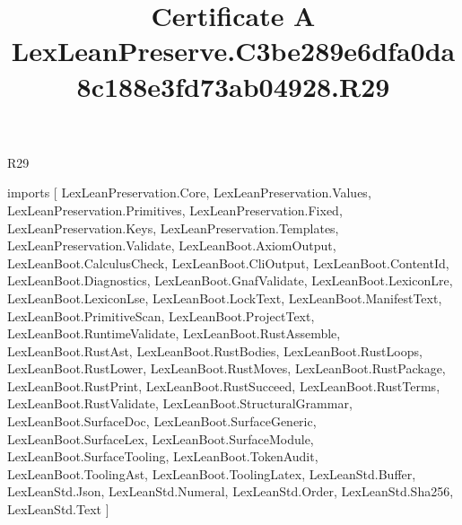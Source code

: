 \begin{lexlean}{R29}
\title{Certificate A LexLeanPreserve.C3be289e6dfa0da8c188e3fd73ab04928.R29}
\begin{coremodule}
imports [
  LexLeanPreservation.Core,
  LexLeanPreservation.Values,
  LexLeanPreservation.Primitives,
  LexLeanPreservation.Fixed,
  LexLeanPreservation.Keys,
  LexLeanPreservation.Templates,
  LexLeanPreservation.Validate,
  LexLeanBoot.AxiomOutput,
  LexLeanBoot.CalculusCheck,
  LexLeanBoot.CliOutput,
  LexLeanBoot.ContentId,
  LexLeanBoot.Diagnostics,
  LexLeanBoot.GnafValidate,
  LexLeanBoot.LexiconLre,
  LexLeanBoot.LexiconLse,
  LexLeanBoot.LockText,
  LexLeanBoot.ManifestText,
  LexLeanBoot.PrimitiveScan,
  LexLeanBoot.ProjectText,
  LexLeanBoot.RuntimeValidate,
  LexLeanBoot.RustAssemble,
  LexLeanBoot.RustAst,
  LexLeanBoot.RustBodies,
  LexLeanBoot.RustLoops,
  LexLeanBoot.RustLower,
  LexLeanBoot.RustMoves,
  LexLeanBoot.RustPackage,
  LexLeanBoot.RustPrint,
  LexLeanBoot.RustSucceed,
  LexLeanBoot.RustTerms,
  LexLeanBoot.RustValidate,
  LexLeanBoot.StructuralGrammar,
  LexLeanBoot.SurfaceDoc,
  LexLeanBoot.SurfaceGeneric,
  LexLeanBoot.SurfaceLex,
  LexLeanBoot.SurfaceModule,
  LexLeanBoot.SurfaceTooling,
  LexLeanBoot.TokenAudit,
  LexLeanBoot.ToolingAst,
  LexLeanBoot.ToolingLatex,
  LexLeanStd.Buffer,
  LexLeanStd.Json,
  LexLeanStd.Numeral,
  LexLeanStd.Order,
  LexLeanStd.Sha256,
  LexLeanStd.Text
]


\end{coremodule}
\end{lexlean}
